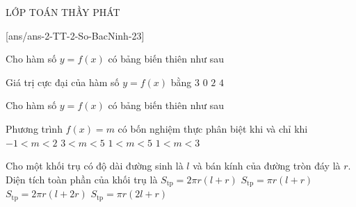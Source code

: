 \begin{name}
	{\tenchude}{\tendethi}{LỚP TOÁN THẦY PHÁT}{\thoigian}
\end{name}
\setcounter{ex}{0}\setcounter{bt}{0}
[ans/ans-2-TT-2-So-BacNinh-23]

\begin{ex}%
	Cho hàm số $y=f(x)$ có bảng biến thiên như sau
	\begin{center}
	\end{center}
	Giá trị cực đại của hàm số $y=f(x)$ bằng
	\choice
	{$3$}
	{$0$}
	{$2$}
	{\True $4$}
\end{ex}


\begin{ex}%
	Cho hàm số $y=f(x)$ có bảng biến thiên như sau
	\begin{center}
	\end{center}
	Phương trình $f(x)=m$ có bốn nghiệm thực phân biệt khi và chỉ khi
	\choice
	{$-1<m<2$}
	{$ 3<m<5$}
	{$ 1<m<5$}
	{\True $ 1<m<3$}
\end{ex}


\begin{ex}%
	Cho một khối trụ có độ dài đường sinh là $l$ và bán kính của đường tròn đáy là $r$. Diện tích toàn phần của khối trụ là
	\choice
	{\True $S_{\text{tp}}=2\pi r\left(l+r\right)$}
	{$S_{\text{tp}}=\pi r\left(l+r\right)$}
	{$S_{\text{tp}}=2\pi r\left(l+2r\right)$}
	{$S_{\text{tp}}=\pi r\left(2l+r\right)$}
\end{ex}


